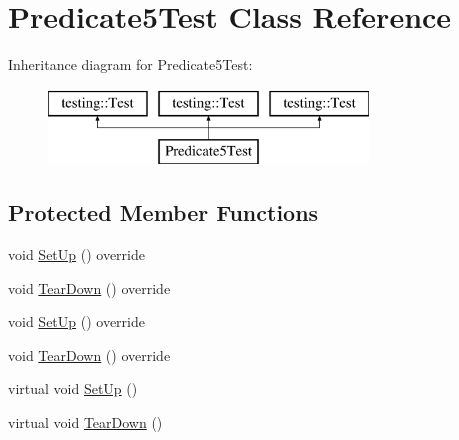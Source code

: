 \hypertarget{class_predicate5_test}{}\section{Predicate5\+Test Class Reference}
\label{class_predicate5_test}
Inheritance diagram for Predicate5\+Test\+:\begin{figure}[H]
\begin{center}
\leavevmode
\includegraphics[height=2.000000cm]{dd/d79/class_predicate5_test}
\end{center}
\end{figure}
\subsection*{Protected Member Functions}
\begin{DoxyCompactItemize}
\item 
void \mbox{\hyperlink{class_predicate5_test_a699fbdc25f5eeb2e810887a60a4b3c1b}{Set\+Up}} () override
\item 
void \mbox{\hyperlink{class_predicate5_test_aab641802c35a2a90f8db0b04dc0c6064}{Tear\+Down}} () override
\item 
void \mbox{\hyperlink{class_predicate5_test_a699fbdc25f5eeb2e810887a60a4b3c1b}{Set\+Up}} () override
\item 
void \mbox{\hyperlink{class_predicate5_test_aab641802c35a2a90f8db0b04dc0c6064}{Tear\+Down}} () override
\item 
virtual void \mbox{\hyperlink{class_predicate5_test_a42bf622b4f2134d0497cd42fd2e3e1df}{Set\+Up}} ()
\item 
virtual void \mbox{\hyperlink{class_predicate5_test_ab7bc4521d96174d5ef96156edc15444d}{Tear\+Down}} ()
\end{DoxyCompactItemize}

